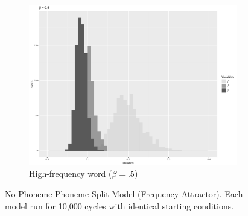 \begin{figure}[h]
\begin{subfigure}[t]{.3\textwidth}
        \includegraphics[width=\linewidth]{figures/SpeakingRateFrequencybeta5.pdf}
        \caption{High-frequency word ($\beta=.5$)}
    \end{subfigure}



\caption{\label{fig:NasalizationModel1}No-Phoneme Phoneme-Split Model (Frequency
Attractor). Each model run for 10,000 cycles with identical starting conditions. }
\end{figure}

